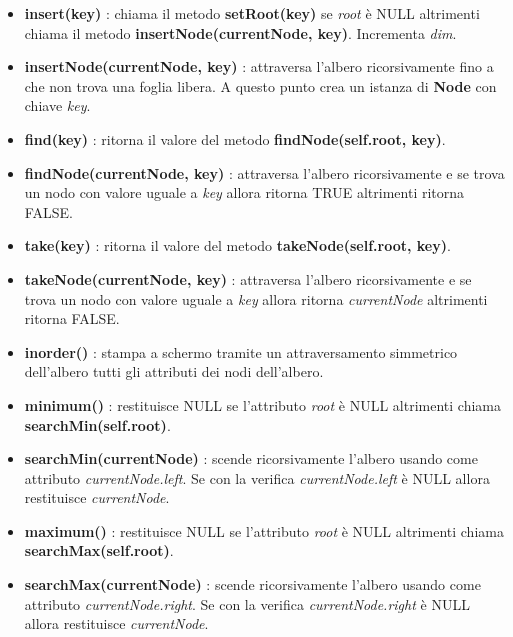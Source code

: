 \begin{itemize}
\begin{itemize}
        \item \textbf{insert(key)} : chiama il metodo \textbf{setRoot(key)} se \textit{root} è NULL altrimenti chiama il metodo \textbf{insertNode(currentNode, key)}. Incrementa \textit{dim}.
        
        \item \textbf{insertNode(currentNode, key)} : attraversa l'albero ricorsivamente fino a che non trova una foglia libera. A questo punto crea un istanza di \textbf{Node} con chiave \textit{key}.
        
        \item \textbf{find(key)} : ritorna il valore del metodo \textbf{findNode(self.root, key)}.
        
        \item \textbf{findNode(currentNode, key)} : attraversa l'albero ricorsivamente e se trova un nodo con valore uguale a \textit{key} allora ritorna TRUE altrimenti ritorna FALSE.
        
        \item \textbf{take(key)} : ritorna il valore del metodo \textbf{takeNode(self.root, key)}.
        
        \item \textbf{takeNode(currentNode, key)} : attraversa l'albero ricorsivamente e se trova un nodo con valore uguale a \textit{key} allora ritorna \textit{currentNode} altrimenti ritorna FALSE.
        
        \item \textbf{inorder()} : stampa a schermo tramite un attraversamento simmetrico dell'albero tutti gli attributi dei nodi dell'albero.
        
        \item \textbf{minimum()} : restituisce NULL se l'attributo \textit{root} è NULL altrimenti chiama \textbf{searchMin(self.root)}.
        
        \item \textbf{searchMin(currentNode)} : scende ricorsivamente l'albero usando come attributo \textit{currentNode.left}. Se con la verifica \textit{currentNode.left} è NULL allora restituisce \textit{currentNode}.
        
        \item \textbf{maximum()} : restituisce NULL se l'attributo \textit{root} è NULL altrimenti chiama \textbf{searchMax(self.root)}.
        
        \item \textbf{searchMax(currentNode)} : scende ricorsivamente l'albero usando come attributo \textit{currentNode.right}. Se con la verifica \textit{currentNode.right} è NULL allora restituisce \textit{currentNode}.
        

\end{itemize}
\end{itemize}
